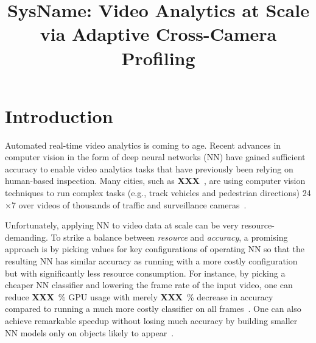 \documentclass[letterpaper,twocolumn]{hotnets17}
\newcommand{\fillme}{{\bf XXX}~}
\newcommand{\name}{{SysName}\xspace}
\begin{document}
{
\title{\name: Video Analytics at Scale via Adaptive Cross-Camera Profiling}

\maketitle

\begin{abstract}



\end{abstract}

\section{Introduction}

Automated real-time video analytics  is coming to age.
Recent advances in computer vision in the form of deep neural networks (NN) have gained sufficient 
accuracy to enable video analytics tasks that have previously been relying on 
human-based inspection.
Many cities, such as \fillme, are using computer vision techniques 
to run complex tasks (e.g., track vehicles and pedestrian directions)
24$\times$7 over videos of thousands of 
traffic and surveillance cameras~\cite{??,??}.
 

Unfortunately, applying NN to video data  at scale can be very resource-demanding. 
To strike a balance between {\em resource} and {\em accuracy}, 
a promising approach is by picking values for 
key configurations of operating NN so that the resulting NN  has 
similar accuracy as running with a more costly configuration 
but with significantly less resource consumption.
For instance, by picking a cheaper NN classifier and 
lowering the frame 
rate of the input video, one can reduce \fillme\% GPU usage
with merely \fillme\% decrease in accuracy compared to running a much more 
costly classifier on all frames~\cite{videostorm}.
One can also achieve remarkable speedup without losing much accuracy by 
building smaller NN models only on objects likely to appear~\cite{noscope}.

}
\end{document}
